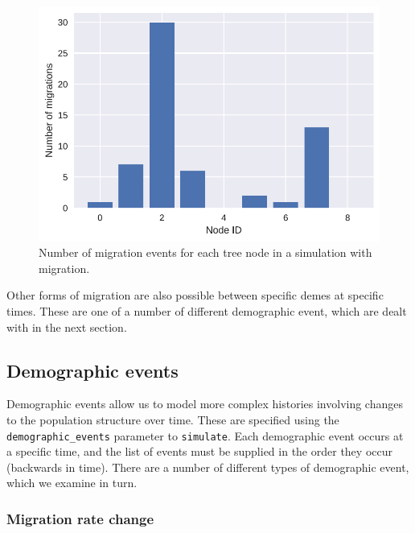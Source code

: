 \documentclass[graybox]{svmult}
\begin{document}
\begin{figure}
\begin{center}
\includegraphics[width=\textwidth]{images/simulations_30_0.pdf}
\end{center}
\caption{\label{fig:migration_counts} Number of migration events for
each tree node in a simulation with migration.}
\end{figure}

Other forms of migration are also possible between specific demes at
specific times. These are one of a number of different demographic
event, which are dealt with in the next section.

\subsection{Demographic events}\label{demographic-events}

Demographic events allow us to model more complex histories involving
changes to the population structure over time. These are specified using
the \texttt{demographic\_events} parameter to \texttt{simulate}. Each
demographic event occurs at a specific time, and the list of events must
be supplied in the order they occur (backwards in time). There are a
number of different types of demographic event, which we examine in
turn.

\subsubsection{Migration rate change}\label{migration-rate-change}
\end{document}
